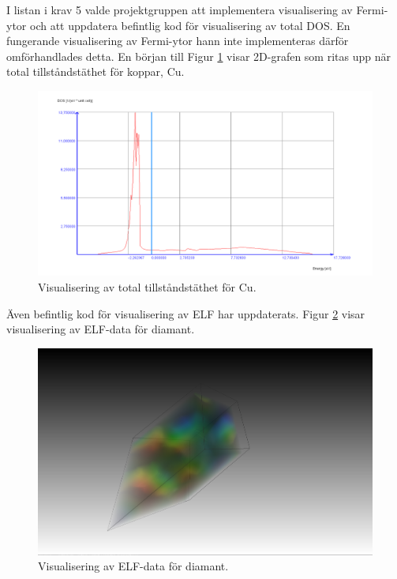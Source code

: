\documentclass[a4paper,12pt]{article}
\begin{document}
\begin{table}[H]
\begin{center}
\begin{tabular}{ |p{10mm}|p{20mm}|p{70mm}|p{15mm}|p{15mm}|}
\end{tabular}
\label{table:kravlista generella systemet}
\end{center}
\end{table}

I listan i krav 5 valde projektgruppen att implementera visualisering av Fermi-ytor och att uppdatera befintlig kod för visualisering av total DOS. En fungerande visualisering av Fermi-ytor hann inte implementeras därför omförhandlades detta.   %
En början till  Figur \ref{fig:visualisering_total_DOS_Cu} visar 2D-grafen som ritas upp när total tillståndstäthet för koppar, Cu.
\begin{figure}[H]
	\centering
	\includegraphics[scale=0.3]{Cu_1_10_total_DOS_visualisering.png}
	\caption{Visualisering av total tillståndstäthet för Cu.}
	\label{fig:visualisering_total_DOS_Cu}
\end{figure}

Även befintlig kod för visualisering av ELF har uppdaterats. Figur \ref{fig:visualisering_diamant_elf} visar visualisering av ELF-data för diamant. 
\begin{figure}[H]
	\centering
	\includegraphics[scale=0.15]{Diamant_elf_visualisering.png}
	\caption{Visualisering av ELF-data för diamant.}
	\label{fig:visualisering_diamant_elf}
\end{figure}
\end{document}
